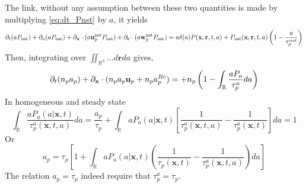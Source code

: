 {The link, without any assumption between these two quantities is made by multiplying \ref{eq:dt_Pnst} by $a$, it yields
\begin{equation*}
    \partial_t (a P_\text{nst})
    + \partial_a (a P_\text{nst})
    + {\partial_\textbf{x}} \cdot  ( a \textbf{u}^\text{nst}_p  P_\text{nst})
    + {\partial_\textbf{r}} \cdot  ( a \textbf{w}^\text{nst}_p  P_\text{nst})
    = a \delta(a) P(\textbf{x},\textbf{r},t,a)
    + P_\text{nst}(\textbf{x},\textbf{r},t,a)\left(
        1 - \frac{a}{\tau_p^{nst}}
    \right)
\end{equation*}
Then, integrating over $\iint_{\mathbb{R}^4} \ldots d\textbf{r}da$ gives, 
\begin{equation*}
    \partial_t (n_p a_p)
    + {\partial_\textbf{x}} \cdot  (n_p a_p \textbf{u}_p + n_p a_p^{Re})
    = 
    + n_p \left(
        1
    - \int_{\mathbb{R}} \frac{a P_a}{\tau_p^a}  da\right)
\end{equation*}
In homogeneous and steady state 
\begin{equation*}
    \int_{\mathbb{R}} \frac{a P_a(a|\textbf{x},t)}{\tau_p^a(\textbf{x},t,a)}  da
    = 
    \frac{a_p}{\tau_p}
    + \int_{\mathbb{R}} a P_a(a|\textbf{x},t)\left[
        \frac{1}{\tau_p^a(\textbf{x},t,a)} 
        - \frac{1}{\tau_p^a(\textbf{x},t)} 
    \right] da
    = 1 
\end{equation*}
Or 
\begin{equation*}
    a_p
    = \tau_p \left[
        1
        + 
        \int_{\mathbb{R}} a P_a(a|\textbf{x},t)\left(
            \frac{1}{\tau_p(\textbf{x},t)} 
            - \frac{1}{\tau_p^a(\textbf{x},t,a)} 
        \right) da
    \right]
\end{equation*}
The relation $a_p = \tau_p$ indeed require that $\tau_p^a = \tau_p$.

}
